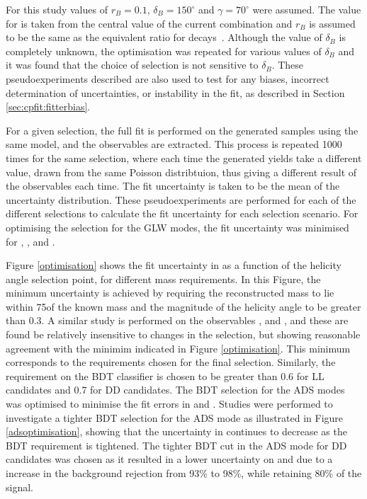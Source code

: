 For this study values of $r_B = 0.1$, $\delta_B = 150^{\circ}$ and $\gamma = 70^{\circ}$ were assumed. The value for \Pgamma is taken from the central value of the current \lhcb combination and $r_B$ is assumed to be the same as the equivalent ratio for \decay{\Bm}{\D\Km} decays~\cite{LHCb-PAPER-2016-032}. Although the value of $\delta_B$ is completely unknown, the optimisation was repeated for various values of $\delta_B$ and it was found that the choice of selection is not sensitive to $\delta_B$.  These pseudoexperiments described are also used to test for any biases, incorrect determination of uncertainties, or instability in the \CP fit, as described in Section \ref{sec:cpfit:fitterbias}. 

For a given selection, the full \CP fit is performed on the generated samples using the same model, and the \CP observables are extracted. This process is repeated 1000 times for the same selection, where each time the generated yields take a different value, drawn from the same Poisson distribtuion, thus giving a different result of the \CP observables each time. The fit uncertainty is taken to be the mean of the uncertainty distribution. These pseudoexperiments are performed for each of the different selections to calculate the fit uncertainty for each selection scenario.  For optimising the selection for the GLW modes, the fit uncertainty was minimised for \Akk, \Rkk, \Apipi and \Rpipi. 

Figure \ref{optimisation} shows the fit uncertainty in \Rkk as a function of the \KS helicity angle selection point, for different \Kstarm mass requirements. In this Figure, the minimum uncertainty is achieved by requiring the reconstructed \Kstarm mass to lie within 75\mevcc of the known \Kstarm mass and the magnitude of the \KS helicity angle to be greater than 0.3. A similar study is performed on the \CP observables \Akk, \Apipi and \Rpipi, and these are found be relatively insensitive to changes in the selection, but showing reasonable agreement with the minimim indicated in Figure \ref{optimisation}. This minimum corresponds to the \Kstarm requirements chosen for the final selection. Similarly, the requirement on the BDT classifier is chosen to be greater than 0.6 for LL candidates and 0.7 for DD candidates. The BDT selection for the ADS modes was optimised to minimise the fit errors in \Rptwo and \Rmtwo. Studies were performed to investigate a tighter BDT selection for the ADS mode as illustrated in Figure \ref{adsoptimisation}, showing that the uncertainty in \Rptwo continues to decrease as the BDT requirement is tightened. The tighter BDT cut in the ADS mode for DD candidates was chosen as it resulted in a lower uncertainty on \Rptwo and \Rmtwo due to a increase in the background rejection from 93\% to 98\%, while retaining 80\% of the signal. 

